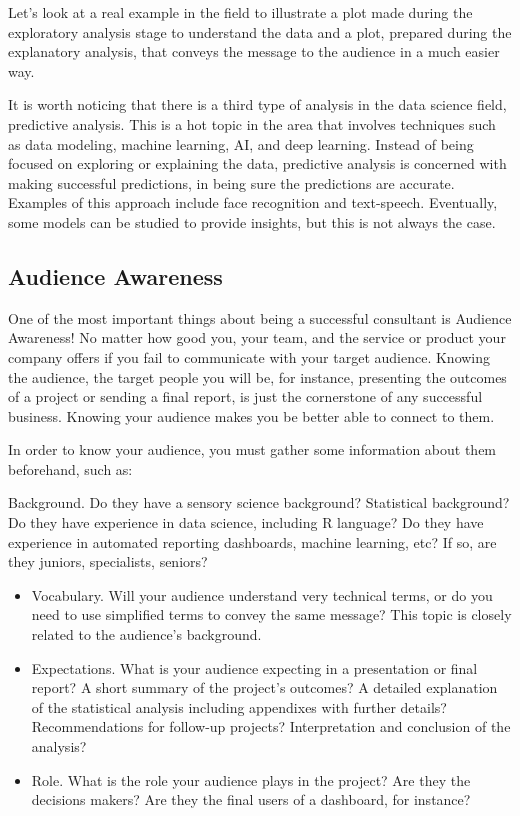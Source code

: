 \documentclass[
]{book}
\begin{document}
Let's look at a real example in the field to illustrate a plot made during the exploratory analysis stage to understand the data and a plot, prepared during the explanatory analysis, that conveys the message to the audience in a much easier way.

It is worth noticing that there is a third type of analysis in the data science field, predictive analysis. This is a hot topic in the area that involves techniques such as data modeling, machine learning, AI, and deep learning. Instead of being focused on exploring or explaining the data, predictive analysis is concerned with making successful predictions, in being sure the predictions are accurate. Examples of this approach include face recognition and text-speech. Eventually, some models can be studied to provide insights, but this is not always the case.

\hypertarget{audience-awareness}{%
\subsection{Audience Awareness}\label{audience-awareness}}

One of the most important things about being a successful consultant is Audience Awareness! No matter how good you, your team, and the service or product your company offers if you fail to communicate with your target audience. Knowing the audience, the target people you will be, for instance, presenting the outcomes of a project or sending a final report, is just the cornerstone of any successful business. Knowing your audience makes you be better able to connect to them.

In order to know your audience, you must gather some information about them beforehand, such as:

Background. Do they have a sensory science background? Statistical background? Do they have experience in data science, including R language? Do they have experience in automated reporting dashboards, machine learning, etc? If so, are they juniors, specialists, seniors?

\begin{itemize}
\item
  Vocabulary. Will your audience understand very technical terms, or do you need to use simplified terms to convey the same message? This topic is closely related to the audience's background.
\item
  Expectations. What is your audience expecting in a presentation or final report? A short summary of the project's outcomes? A detailed explanation of the statistical analysis including appendixes with further details? Recommendations for follow-up projects? Interpretation and conclusion of the analysis?
\item
  Role. What is the role your audience plays in the project? Are they the decisions makers? Are they the final users of a dashboard, for instance?
\end{itemize}
\end{document}
